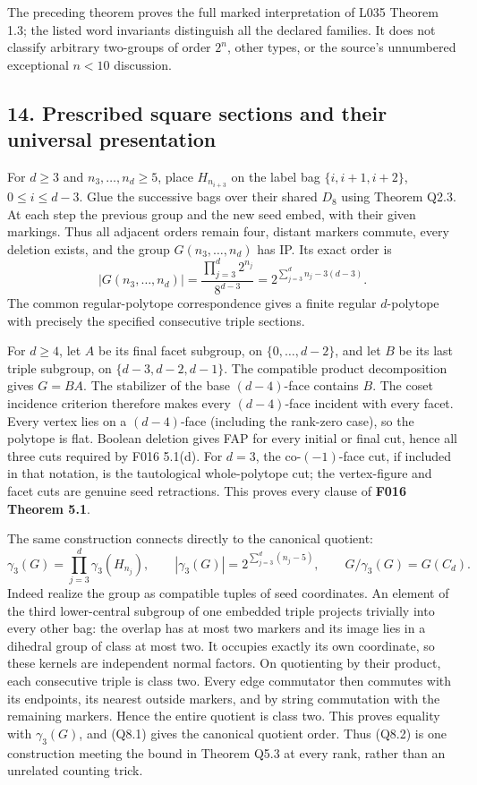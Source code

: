 \documentclass[
  10pt,
  letterpaper,
]{article}
\begin{document}
The preceding theorem proves the full marked interpretation of L035
Theorem 1.3; the listed word invariants distinguish all the declared
families. It does not classify arbitrary two-groups of order \(2^n\),
other types, or the source's unnumbered exceptional \(n<10\) discussion.

\subsection{14. Prescribed square sections and their universal
presentation}\label{prescribed-square-sections-and-their-universal-presentation}

For \(d\ge3\) and \(n_3,\ldots,n_d\ge5\), place \(H_{n_{i+3}}\) on the
label bag \(\{i,i+1,i+2\}\), \(0\le i\le d-3\). Glue the successive bags
over their shared \(D_8\) using Theorem Q2.3. At each step the previous
group and the new seed embed, with their given markings. Thus all
adjacent orders remain four, distant markers commute, every deletion
exists, and the group \(G(n_3,\ldots,n_d)\) has IP. Its exact order is
\[
 |G(n_3,\ldots,n_d)|
 =\frac{\prod_{j=3}^d2^{n_j}}{8^{d-3}}
 =2^{\sum_{j=3}^d n_j-3(d-3)}.                           \tag{Q8.1}
\] The common regular-polytope correspondence gives a finite regular
\(d\)-polytope with precisely the specified consecutive triple sections.

For \(d\ge4\), let \(A\) be its final facet subgroup, on
\(\{0,\ldots,d-2\}\), and let \(B\) be its last triple subgroup, on
\(\{d-3,d-2,d-1\}\). The compatible product decomposition gives
\(G=BA\). The stabilizer of the base \((d-4)\)-face contains \(B\). The
coset incidence criterion therefore makes every \((d-4)\)-face incident
with every facet. Every vertex lies on a \((d-4)\)-face (including the
rank-zero case), so the polytope is flat. Boolean deletion gives FAP for
every initial or final cut, hence all three cuts required by F016
5.1(d). For \(d=3\), the co-\((-1)\)-face cut, if included in that
notation, is the tautological whole-polytope cut; the vertex-figure and
facet cuts are genuine seed retractions. This proves every clause of
\textbf{F016 Theorem 5.1}.

The same construction connects directly to the canonical quotient: \[
 \gamma_3(G)=\prod_{j=3}^d\gamma_3(H_{n_j}),\qquad
 |\gamma_3(G)|=2^{\sum_{j=3}^d(n_j-5)},\qquad
 G/\gamma_3(G)=G(C_d).                                  \tag{Q8.2}
\] Indeed realize the group as compatible tuples of seed coordinates. An
element of the third lower-central subgroup of one embedded triple
projects trivially into every other bag: the overlap has at most two
markers and its image lies in a dihedral group of class at most two. It
occupies exactly its own coordinate, so these kernels are independent
normal factors. On quotienting by their product, each consecutive triple
is class two. Every edge commutator then commutes with its endpoints,
its nearest outside markers, and by string commutation with the
remaining markers. Hence the entire quotient is class two. This proves
equality with \(\gamma_3(G)\), and (Q8.1) gives the canonical quotient
order. Thus (Q8.2) is one construction meeting the bound in Theorem Q5.3
at every rank, rather than an unrelated counting trick.
\end{document}
